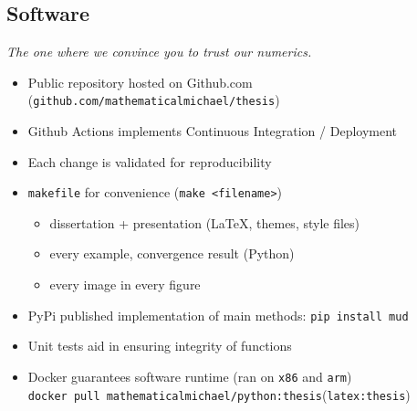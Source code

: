 \subsection{Software}

\begin{frame}{\it The one where we convince you to trust our numerics.}

\begin{itemize}
	\item Public repository hosted on Github.com ({\tt github.com/mathematicalmichael/thesis})
	\item Github Actions implements Continuous Integration / Deployment
	\item Each change is validated for reproducibility
	\item {\tt makefile} for convenience ({\tt make <filename>})
	\begin{itemize}
		\item dissertation + presentation (\LaTeX, themes, style files)
		\item every example, convergence result (Python)
		\item every image in every figure
	\end{itemize}
	\item PyPi published implementation of main methods: {\tt pip install mud}
	\item Unit tests aid in ensuring integrity of functions
	\item Docker guarantees software runtime (ran on {\tt x86} and {\tt arm}) \\ {\tt docker pull mathematicalmichael/python:thesis}({\tt latex:thesis})
\end{itemize}


\end{frame}
